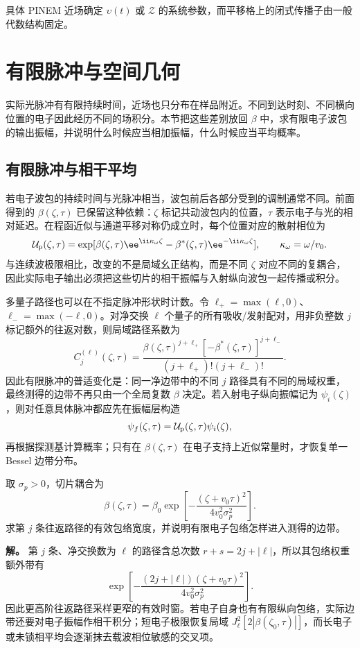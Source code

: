 具体 PINEM 近场确定 $\upsilon(t)$ 或 $\mathcal Z$ 的系统参数，而平移格上的闭式传播子由一般代数结构固定。



\section{有限脉冲与空间几何}

实际光脉冲有有限持续时间，近场也只分布在样品附近。不同到达时刻、不同横向位置的电子因此经历不同的场积分。本节把这些差别放回 $\beta$ 中，求有限电子波包的输出振幅，并说明什么时候应当相加振幅，什么时候应当平均概率。

\subsection{有限脉冲与相干平均}

若电子波包的持续时间与光脉冲相当，波包前后各部分受到的调制通常不同。前面得到的 $\beta(\zeta,\tau)$ 已保留这种依赖：$\zeta$ 标记共动波包内的位置，$\tau$ 表示电子与光的相对延迟。在程函近似与通道平移对称仍成立时，每个位置对应的散射相位为
\begin{equation}
{
\mathcal U_{\rm p}(\zeta,\tau)
=\exp[\beta(\zeta,\tau)\ee^{\ii\kappa_\omega\zeta}
-\beta^*(\zeta,\tau)\ee^{-\ii\kappa_\omega\zeta}],
\qquad \kappa_\omega=\omega/v_0.}
\label{eq:pinem_finite_pulse_local_phase}
\end{equation}
与连续波极限相比，改变的不是局域幺正结构，而是不同 $\zeta$ 对应不同的复耦合，因此实际电子输出必须把这些切片的相干振幅与入射纵向波包一起传播或积分。

多量子路径也可以在不指定脉冲形状时计数。令 $\ell_+=\max(\ell,0)$、$\ell_-=\max(-\ell,0)$。对净交换 $\ell$ 个量子的所有吸收/发射配对，用非负整数 $j$ 标记额外的往返对数，则局域路径系数为
\begin{equation}
{
C_j^{(\ell)}(\zeta,\tau)
=\frac{\beta(\zeta,\tau)^{j+\ell_+}
[-\beta^*(\zeta,\tau)]^{j+\ell_-}}
{(j+\ell_+)!(j+\ell_-)!}.}
\label{eq:park_Cjn_general}
\end{equation}
因此有限脉冲的普适变化是：同一净边带中的不同 $j$ 路径具有不同的局域权重，最终测得的边带不再只由一个全局复数 $\beta$ 决定。若入射电子纵向振幅记为 $\psi_i(\zeta)$，则对任意具体脉冲都应先在振幅层构造
\[
\psi_f(\zeta,\tau)
=\mathcal U_{\rm p}(\zeta,\tau)\psi_i(\zeta),
\]
再根据探测基计算概率；只有在 $\beta(\zeta,\tau)$ 在电子支持上近似常量时，才恢复单一 Bessel 边带分布。

\begin{exbox}[高斯光脉冲]
取 $\sigma_p>0$，切片耦合为
\[
\beta(\zeta,\tau)=\beta_0
\exp\!\left[-\frac{(\zeta+v_0\tau)^2}{4v_0^2\sigma_p^2}\right].
\]
求第 $j$ 条往返路径的有效包络宽度，并说明有限电子包络怎样进入测得的边带。

\textbf{解。} 第 $j$ 条、净交换数为 $\ell$ 的路径含总次数
$r+s=2j+|\ell|$，所以其包络权重额外带有
\[
\exp\!\left[-\frac{(2j+|\ell|)(\zeta+v_0\tau)^2}
{4v_0^2\sigma_p^2}\right].
\]
因此更高阶往返路径采样更窄的有效时窗。若电子自身也有有限纵向包络，实际边带还要对电子振幅作相干积分；短电子极限恢复局域 $J_\ell^2[2|\beta(\zeta_0,\tau)|]$，而长电子或未锁相平均会逐渐抹去载波相位敏感的交叉项。
\end{exbox}

